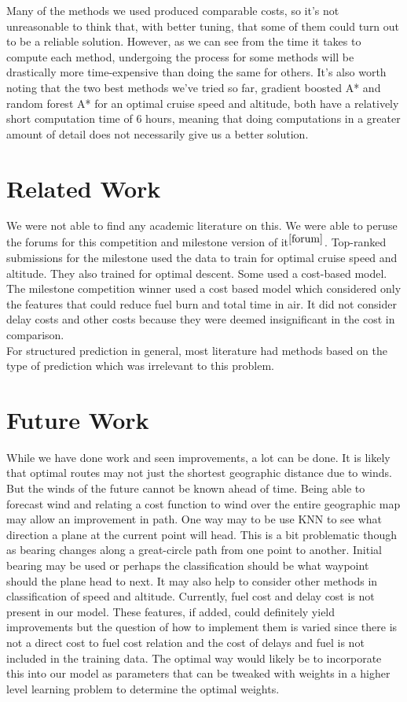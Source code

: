 \documentclass{article}[12pt]
\begin{document}
\begin{multicols}{2}
Many of the methods we used produced comparable costs, so it's not unreasonable to think that, with better tuning, that some of them could turn out to be a reliable solution. However, as we can see from the time it takes to compute each method, undergoing the process for some methods will be drastically more time-expensive than doing the same for others. It's also worth noting that the two best methods we've tried so far, gradient boosted A* and random forest A* for an optimal cruise speed and altitude, both have a relatively short computation time of 6 hours, meaning that doing computations in a greater amount of detail does not necessarily give us a better solution.  

\section{Related Work}
We were not able to find any academic literature on this. We were able to peruse the forums for this competition and milestone version of it$^{\cite{forum}}$. Top-ranked submissions for the milestone used the data to train for optimal cruise speed and altitude. They also trained for optimal descent. Some used a cost-based model. The milestone competition winner used a cost based model which considered only the features that could reduce fuel burn and total time in air. It did not consider delay costs and other costs because they were deemed insignificant in the cost in comparison. \\

For structured prediction in general, most literature had methods based on the type of prediction which was irrelevant to this problem.

\section{Future Work}
While we have done work and seen improvements, a lot can be done. It is likely that optimal routes may not just the shortest geographic distance due to winds. But the winds of the future cannot be known ahead of time. Being able to forecast wind and relating a cost function to wind over the entire geographic map may allow an improvement in path. One way may to be use KNN to see what direction a plane at the current point will head. This is a bit problematic though as bearing changes along a great-circle path from one point to another. Initial bearing may be used or perhaps the classification should be what waypoint should the plane head to next. It may also help to consider other methods in classification of speed and altitude. Currently, fuel cost and delay cost is not present in our model. These features, if added, could definitely yield improvements but the question of how to implement them is varied since there is not a direct cost to fuel cost relation and the cost of delays and fuel is not included in the training data. The optimal way would likely be to incorporate this into our model as parameters that can be tweaked with weights in a higher level learning problem to determine the optimal weights. \\


\end{multicols}
\end{document}
